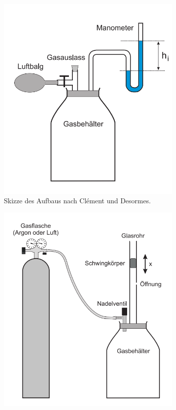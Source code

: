 \documentclass[a4paper,10pt]{article}
\begin{document}
\begin{figure}[htb]
  \centering
  \begin{subfigure}{0.48\textwidth}
  \includegraphics[width=1\linewidth]{pic1.png}
  \caption{Skizze des Aufbaus nach Clément und Desormes.}
\label{fig:aufbau1}
  \end{subfigure}
    \begin{subfigure}{0.48\textwidth}
 \includegraphics[width=1\linewidth]{pic2.png}

\end{subfigure}
\end{figure}
\end{document}
